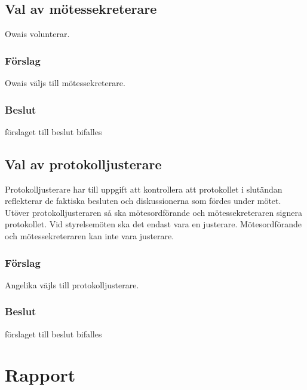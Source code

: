 \documentclass[protokoll]{dvd}
\begin{document}
\subsection{Val av mötessekreterare}
Owais volunterar.

\subsubsection*{Förslag}
\begin{attsatser}
    \item Owais väljs till mötessekreterare. 
\end{attsatser}
\subsubsection*{Beslut}
\begin{attsatser}
    \item förslaget till beslut bifalles
\end{attsatser}

\subsection{Val av protokolljusterare}

Protokolljusterare har till uppgift att kontrollera att protokollet i slutändan reflekterar de faktiska besluten och diskussionerna som fördes under mötet.
Utöver protokolljusteraren så ska mötesordförande och mötessekreteraren signera protokollet.
Vid styrelsemöten ska det endast vara en justerare.
Mötesordförande och mötessekreteraren kan inte vara justerare.

\subsubsection*{Förslag}
\begin{attsatser}
    \item Angelika väjls till protokolljusterare.
\end{attsatser}
\subsubsection*{Beslut}
\begin{attsatser}
    \item förslaget till beslut bifalles
\end{attsatser}

\section{Rapport} 
\end{document}
